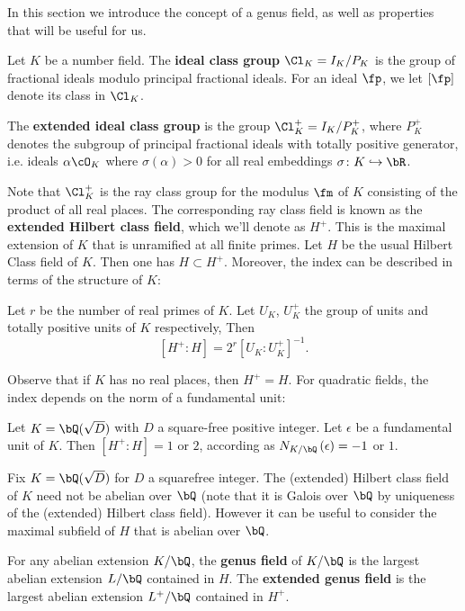 In this section we introduce the concept of a genus field, as well as properties that will be useful for us.

Let $K$ be a number field. The \textbf{ideal class group} $\Cl_K = I_K / P_K$ is the group of fractional ideals modulo principal fractional ideals.
For an ideal $\fp$, we let $[\fp]$ denote its class in $\Cl_K$.

The \textbf{extended ideal class group} is the group $\Cl_K^{+} = I_K / P_K^{+}$, where
$P_K^{+}$ denotes the subgroup of principal fractional ideals with totally positive generator, i.e. ideals $\alpha \cO_K$ where $\sigma(\alpha) > 0$ for all real embeddings $\sigma \colon K \emb \bR$.

Note that $\Cl_K^{+}$ is the ray class group for the modulus $\fm$ of $K$ consisting of the product of all real places. The corresponding ray class field is known as the \textbf{extended Hilbert class field}, which we'll denote as $H^{+}$. This is the maximal extension of $K$ that is unramified at all finite primes. Let $H$ be the usual Hilbert Class field of $K$. Then one has $H \subset H^{+}$. Moreover, the index can be described in terms of the structure of $K$:

\begin{thm}\cite[Chapter VI, Section 3, Theorem 3.1]{Janusz}
    Let $r$ be the number of real primes of $K$. Let $U_K$, $U_K^{+}$ the group of units and totally positive units of $K$ respectively, Then 
    \[ [H^{+} \colon H] = 2^r [U_K \colon U_K^{+}]^{-1} .\]
\end{thm}
Observe that if $K$ has no real places, then $H^{+} = H$. For quadratic fields, the index depends on the norm of a fundamental unit:

\begin{cor}
    Let $K = \bQ(\sqrt{D})$ with $D$ a square-free positive integer. Let $\epsilon$ be a fundamental unit of $K$. Then $[H^{+} \colon H] = 1$ or $2$, according as $N_{K / \bQ}\left(\epsilon\right) = -1$ or $1$. 
\end{cor}


Fix $K = \bQ(\sqrt{D})$ for $D$ a squarefree integer. The (extended) Hilbert class field of $K$ need not be abelian over $\bQ$ (note that it is Galois over $\bQ$ by uniqueness of the (extended) Hilbert class field). However it can be useful to consider the maximal subfield of $H$ that is abelian over $\bQ$. 

\begin{defn}
    For any abelian extension $K / \bQ$, the \textbf{genus field} of $K / \bQ$ is the largest abelian extension $L / \bQ$ contained in $H$. The \textbf{extended genus field } is the largest abelian extension $L^{+} / \bQ $ contained in $H^{+}$.
\end{defn}

